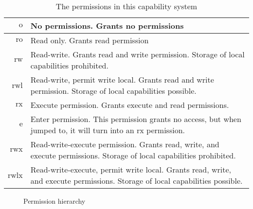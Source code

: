 \documentclass[a4paper]{article}
\newcommand{\plainperm}[1]{\mathrm{#1}}
\newcommand{\noperm}{\plainperm{o}}
\newcommand{\readonly}{\plainperm{ro}}
\newcommand{\readwrite}{\plainperm{rw}}
\newcommand{\exec}{\plainperm{rx}}
\newcommand{\entry}{\plainperm{e}}
\newcommand{\rwx}{\plainperm{rwx}}
\newcommand{\readwritel}{\plainperm{rwl}}
\newcommand{\rwlx}{\plainperm{rwlx}}
\begin{document}
\begin{table}[!h]
  \centering
  \begin{tabular}[!h]{r |  p{7cm} }
    $\noperm$ & No permissions. Grants no permissions\\
    \hline
    $\readonly$ & Read only. Grants read permission \\
    \hline
    $\readwrite$ & Read-write. Grants read and write permission. Storage of local capabilities prohibited. \\
    \hline
    $\readwritel$ & Read-write, permit write local. Grants read and write permission. Storage of local capabilities possible. \\
    \hline
    $\exec$ & Execute permission. Grants execute and read permissions.\\
    \hline
    $\entry$ & Enter permission. This permission grants no access, but when jumped to, it will turn into an $\exec$ permission.\\
    \hline
    $\rwx$ & Read-write-execute permission. Grants read, write, and execute permissions. Storage of local capabilities prohibited. \\
    \hline
    $\rwlx$ & Read-write-execute, permit write local. Grants read, write, and execute permissions. Storage of local capabilities possible.
  \end{tabular}

  \caption{The permissions in this capability system}
  \label{tab:permission-list}
\end{table}
\begin{figure}[!h]
  \centering

  \caption{Permission hierarchy}
  \label{fig:perm-hier}
\end{figure}
\end{document}
